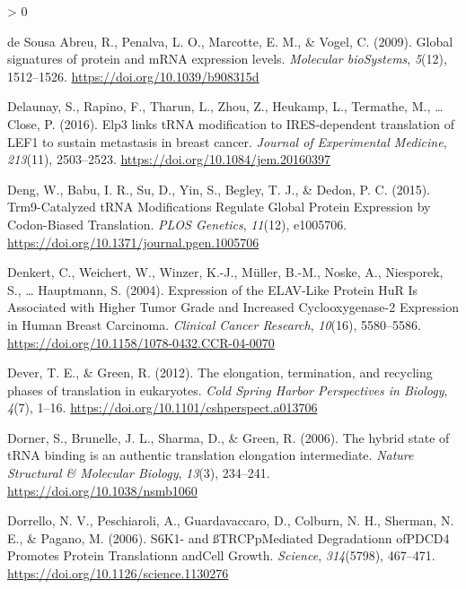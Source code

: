 \documentclass[
  12pt,
  openany]{book}
\newlength{\cslhangindent}
\newenvironment{CSLReferences}[2] %
 {%
  \setlength{\parindent}{0pt}
  \ifodd #1 \everypar{\setlength{\hangindent}{\cslhangindent}}\ignorespaces\fi
  \ifnum #2 > 0
  \setlength{\parskip}{#2\baselineskip}
  \fi
 }%
 {}
\begin{document}
\begin{CSLReferences}{1}{0}
\leavevmode\hypertarget{ref-deSousaAbreu2009}{}%
de Sousa Abreu, R., Penalva, L. O., Marcotte, E. M., \& Vogel, C. (2009). Global signatures of protein and {mRNA} expression levels. \emph{Molecular bioSystems}, \emph{5}(12), 1512--1526. \url{https://doi.org/10.1039/b908315d}

\leavevmode\hypertarget{ref-Delaunay2016}{}%
Delaunay, S., Rapino, F., Tharun, L., Zhou, Z., Heukamp, L., Termathe, M., \ldots{} Close, P. (2016). Elp3 links {tRNA} modification to {IRES}-dependent translation of {LEF1} to sustain metastasis in breast cancer. \emph{Journal of Experimental Medicine}, \emph{213}(11), 2503--2523. \url{https://doi.org/10.1084/jem.20160397}

\leavevmode\hypertarget{ref-Deng2015}{}%
Deng, W., Babu, I. R., Su, D., Yin, S., Begley, T. J., \& Dedon, P. C. (2015). Trm9-{Catalyzed tRNA Modifications Regulate Global Protein Expression} by {Codon}-{Biased Translation}. \emph{PLOS Genetics}, \emph{11}(12), e1005706. \url{https://doi.org/10.1371/journal.pgen.1005706}

\leavevmode\hypertarget{ref-Denkert2004}{}%
Denkert, C., Weichert, W., Winzer, K.-J., Müller, B.-M., Noske, A., Niesporek, S., \ldots{} Hauptmann, S. (2004). Expression of the {ELAV}-{Like Protein HuR Is Associated} with {Higher Tumor Grade} and {Increased Cyclooxygenase}-2 {Expression} in {Human Breast Carcinoma}. \emph{Clinical Cancer Research}, \emph{10}(16), 5580--5586. \url{https://doi.org/10.1158/1078-0432.CCR-04-0070}

\leavevmode\hypertarget{ref-Dever2012}{}%
Dever, T. E., \& Green, R. (2012). The elongation, termination, and recycling phases of translation in eukaryotes. \emph{Cold Spring Harbor Perspectives in Biology}, \emph{4}(7), 1--16. \url{https://doi.org/10.1101/cshperspect.a013706}

\leavevmode\hypertarget{ref-Dorner2006}{}%
Dorner, S., Brunelle, J. L., Sharma, D., \& Green, R. (2006). The hybrid state of {tRNA} binding is an authentic translation elongation intermediate. \emph{Nature Structural \& Molecular Biology}, \emph{13}(3), 234--241. \url{https://doi.org/10.1038/nsmb1060}

\leavevmode\hypertarget{ref-Dorrello2006}{}%
Dorrello, N. V., Peschiaroli, A., Guardavaccaro, D., Colburn, N. H., Sherman, N. E., \& Pagano, M. (2006). {S6K1}- and {ßTRCP}p{Mediated Degradation}n of{PDCD4 Promotes Protein Translation}n and{Cell Growth}. \emph{Science}, \emph{314}(5798), 467--471. \url{https://doi.org/10.1126/science.1130276}


\end{CSLReferences}
\end{document}
